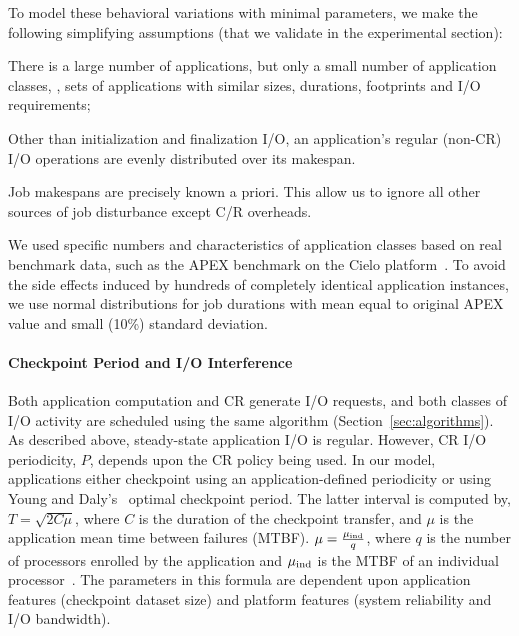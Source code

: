 To model these behavioral variations with minimal parameters, we make the following
simplifying assumptions (that we validate in the experimental section):
\begin{compactitem}
\item There is a large number of applications, but only a small number of application
  classes, \ie, sets of applications with similar sizes, durations, footprints and
  I/O requirements;
\item Other than initialization and finalization I/O, an application's regular
  (non-CR) I/O operations are evenly distributed over its makespan.
\item Job makespans are precisely known a priori. This allow us to ignore all other
  sources of job disturbance except C/R overheads.
\end{compactitem}
We used specific numbers and characteristics of application classes based on real
benchmark data, such as the APEX benchmark on the Cielo platform~\cite{apex2016}.  To
avoid the side effects induced by hundreds of completely identical application
instances, we use normal distributions for job durations with mean equal to original
APEX value and small (10\%) standard deviation.

\paragraph{Checkpoint Period and I/O Interference}

Both application computation and CR generate I/O requests, and both classes of I/O
activity are scheduled using the same algorithm (Section~\ref{sec:algorithms}). As
described above, steady-state application I/O is regular. However, CR I/O
periodicity, $P$, depends
upon the CR policy being used.  In our model, applications either checkpoint using an
application-defined periodicity or using Young and
Daly's~\cite{young74,daly04} optimal checkpoint period. The latter interval is
computed by, $T=\sqrt{2 C \mu}$, where $C$ is the duration of the checkpoint
transfer, and $\mu$ is the application mean time between failures (MTBF).
$\mu = \frac{\mu_{\text{ind}}}{q}$, where $q$ is the number of processors enrolled by the
application and $\mu_{\text{ind}}$ is the MTBF of an individual
processor~\cite{springer-monograph}.  The parameters in this formula are dependent
upon application features (checkpoint dataset size) and platform features (system
reliability and I/O bandwidth).

